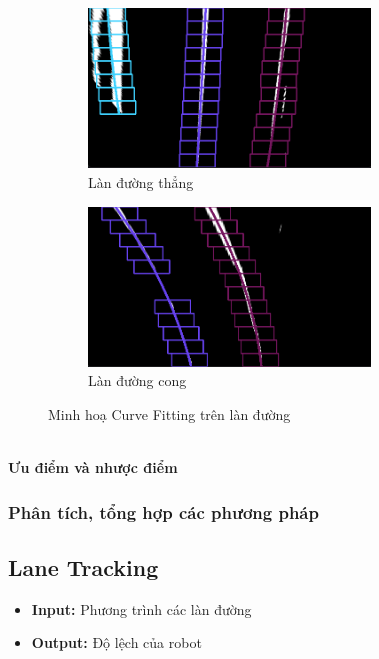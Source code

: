 \begin{figure}[!hbt]
    \begin{subfigure}{0.5\textwidth}
        \centering
        \includegraphics[width=7.5cm]{img/4_Implement/sliding_window/straight.png}
        \caption{Làn đường thẳng}
    \end{subfigure}%
    \begin{subfigure}{0.5\textwidth}
        \centering
        \includegraphics[width=7.5cm]{img/4_Implement/sliding_window/curve.png}
        \caption{Làn đường cong}
    \end{subfigure}
    \caption{Minh hoạ Curve Fitting trên làn đường}
\end{figure}\\
\textbf{Ưu điểm và nhược điểm}
\subsubsection{Phân tích, tổng hợp các phương pháp}
\newpage
\subsection{Lane Tracking}
\begin{itemize}
    \item \textbf{Input:} Phương trình các làn đường
    \item \textbf{Output:} Độ lệch của robot
\end{itemize}
